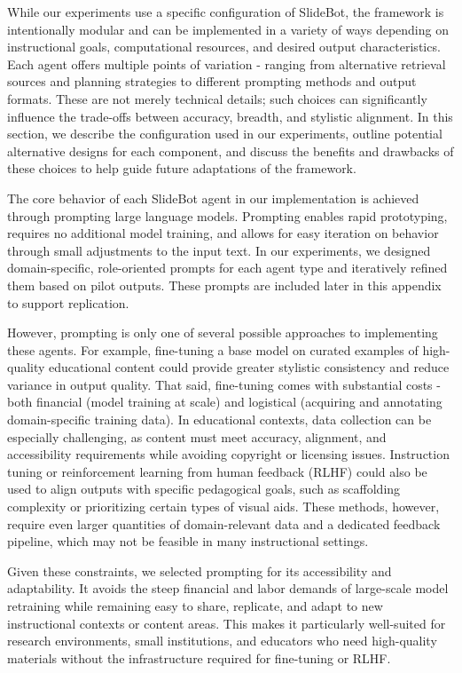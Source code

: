 \documentclass[letterpaper]{article} %
\begin{document}
While our experiments use a specific configuration of SlideBot, the framework is intentionally modular and can be implemented in a variety of ways depending on instructional goals, computational resources, and desired output characteristics. Each agent offers multiple points of variation - ranging from alternative retrieval sources and planning strategies to different prompting methods and output formats. These are not merely technical details; such choices can significantly influence the trade-offs between accuracy, breadth, and stylistic alignment. In this section, we describe the configuration used in our experiments, outline potential alternative designs for each component, and discuss the benefits and drawbacks of these choices to help guide future adaptations of the framework. 

The core behavior of each SlideBot agent in our implementation is achieved through prompting large language models. Prompting enables rapid prototyping, requires no additional model training, and allows for easy iteration on behavior through small adjustments to the input text. In our experiments, we designed domain-specific, role-oriented prompts for each agent type and iteratively refined them based on pilot outputs. These prompts are included later in this appendix to support replication.

However, prompting is only one of several possible approaches to implementing these agents. For example, fine-tuning a base model on curated examples of high-quality educational content could provide greater stylistic consistency and reduce variance in output quality. That said, fine-tuning comes with substantial costs - both financial (model training at scale) and logistical (acquiring and annotating domain-specific training data). In educational contexts, data collection can be especially challenging, as content must meet accuracy, alignment, and accessibility requirements while avoiding copyright or licensing issues. Instruction tuning or reinforcement learning from human feedback (RLHF) could also be used to align outputs with specific pedagogical goals, such as scaffolding complexity or prioritizing certain types of visual aids. These methods, however, require even larger quantities of domain-relevant data and a dedicated feedback pipeline, which may not be feasible in many instructional settings. 

Given these constraints, we selected prompting for its accessibility and adaptability. It avoids the steep financial and labor demands of large-scale model retraining while remaining easy to share, replicate, and adapt to new instructional contexts or content areas. This makes it particularly well-suited for research environments, small institutions, and educators who need high-quality materials without the infrastructure required for fine-tuning or RLHF.
\end{document}
